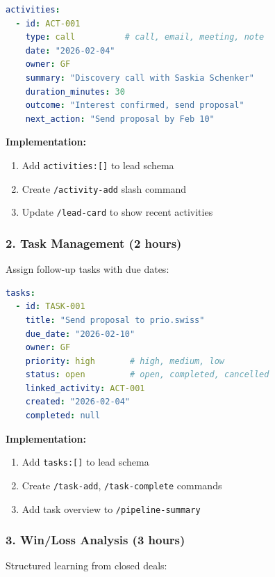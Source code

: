 \begin{lstlisting}[language=yaml,basicstyle=\ttfamily\small]
activities:
  - id: ACT-001
    type: call          # call, email, meeting, note
    date: "2026-02-04"
    owner: GF
    summary: "Discovery call with Saskia Schenker"
    duration_minutes: 30
    outcome: "Interest confirmed, send proposal"
    next_action: "Send proposal by Feb 10"
\end{lstlisting}

\textbf{Implementation:}
\begin{enumerate}[nosep]
    \item Add \texttt{activities:[]} to lead schema
    \item Create \texttt{/activity-add} slash command
    \item Update \texttt{/lead-card} to show recent activities
\end{enumerate}

\subsubsection{2. Task Management (2 hours)}

Assign follow-up tasks with due dates:

\begin{lstlisting}[language=yaml,basicstyle=\ttfamily\small]
tasks:
  - id: TASK-001
    title: "Send proposal to prio.swiss"
    due_date: "2026-02-10"
    owner: GF
    priority: high       # high, medium, low
    status: open         # open, completed, cancelled
    linked_activity: ACT-001
    created: "2026-02-04"
    completed: null
\end{lstlisting}

\textbf{Implementation:}
\begin{enumerate}[nosep]
    \item Add \texttt{tasks:[]} to lead schema
    \item Create \texttt{/task-add}, \texttt{/task-complete} commands
    \item Add task overview to \texttt{/pipeline-summary}
\end{enumerate}

\subsubsection{3. Win/Loss Analysis (3 hours)}

Structured learning from closed deals:

